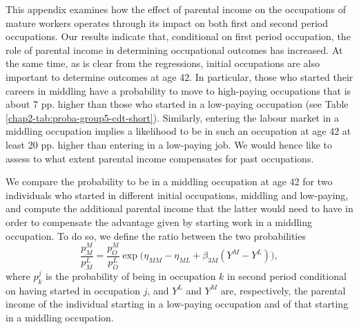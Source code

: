 
This appendix examines how the effect of parental income on the occupations of mature workers operates through its impact on both first and second period occupations. Our results indicate that, conditional on first period occupation, the role of parental income in determining occupational outcomes has increased. At the same time, as is clear from the regressions, initial occupations are also important to determine outcomes at age 42. In particular, those who started their careers in middling have a probability to move to high-paying occupations that is about 7 pp. higher than those who started in a low-paying occupation (see Table \ref{chap2-tab:proba-group5-cdt-short}). Similarly, entering the labour market in a middling occupation implies a likelihood to be in such an occupation at age 42 at least 20 pp. higher than entering in a low-paying job. We would hence like to assess to what extent parental income compensates for past occupations. 

We compare the probability to be in a middling occupation at age 42 for two individuals who started in different initial occupations, middling and low-paying, and compute the additional parental income that the latter would need to have in order to compensate the advantage given by starting work in a middling occupation. To do so, we define the ratio between the two probabilities
\begin{equation}\label{chap2-eq:relative-proba}
    \frac{p_{M}^{M}}{p_{M}^{L}} = \frac{p_O^M}{p_O^L}\exp\Big(\eta_{MM} -\eta_{ML} + \beta_{3M} (Y^M-Y^L)\Big),
\end{equation}
where $p^j_k$ is the probability of being in occupation $k$ in second period conditional on having started in occupation $j$, and $Y^L$ and $Y^M$ are, respectively, the parental income of the individual starting in a low-paying occupation and of that starting in a middling occupation. 

